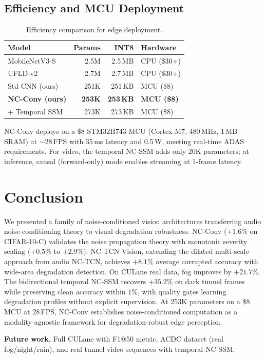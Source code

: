 \documentclass[runningheads]{llncs}
\begin{document}
\subsection{Efficiency and MCU Deployment}

\begin{table}[t]
\centering
\caption{Efficiency comparison for edge deployment.}
\label{tab:efficiency}
\small
\begin{tabular}{@{}lrrl@{}}
\toprule
\textbf{Model} & \textbf{Params} & \textbf{INT8} & \textbf{Hardware} \\
\midrule
MobileNetV3-S & 2.5M & 2.5\,MB & CPU (\$30+) \\
UFLD-v2 & 2.7M & 2.7\,MB & CPU (\$30+) \\
\midrule
Std CNN (ours) & 251K & 251\,KB & MCU (\$8) \\
\textbf{NC-Conv (ours)} & \textbf{253K} & \textbf{253\,KB} & \textbf{MCU (\$8)} \\
+ Temporal SSM & 273K & 273\,KB & MCU (\$8) \\
\bottomrule
\end{tabular}
\end{table}

NC-Conv deploys on a \$8 STM32H743 MCU (Cortex-M7, 480\,MHz, 1\,MB SRAM) at ${\sim}$28\,FPS with 35\,ms latency and 0.5\,W, meeting real-time ADAS requirements.
For video, the temporal NC-SSM adds only 20K parameters; at inference, causal (forward-only) mode enables streaming at 1-frame latency.


\section{Conclusion}
\label{sec:conclusion}

We presented a family of noise-conditioned vision architectures transferring audio noise-conditioning theory to visual degradation robustness.
NC-Conv ($+1.6\%$ on CIFAR-10-C) validates the noise propagation theory with monotonic severity scaling ($+0.5\%$ to $+2.9\%$).
NC-TCN Vision, extending the dilated multi-scale approach from audio NC-TCN, achieves $\mathbf{+8.1\%}$ average corrupted accuracy with wide-area degradation detection.
On CULane real data, fog improves by $+21.7\%$.
The bidirectional temporal NC-SSM recovers $+35.2\%$ on dark tunnel frames while preserving clean accuracy within $1\%$, with quality gates learning degradation profiles without explicit supervision.
At 253K parameters on a \$8 MCU at 28\,FPS, NC-Conv establishes noise-conditioned computation as a modality-agnostic framework for degradation-robust edge perception.

\noindent\textbf{Future work.}
Full CULane with F1@50 metric, ACDC dataset (real fog/night/rain), and real tunnel video sequences with temporal NC-SSM.




\end{document}
